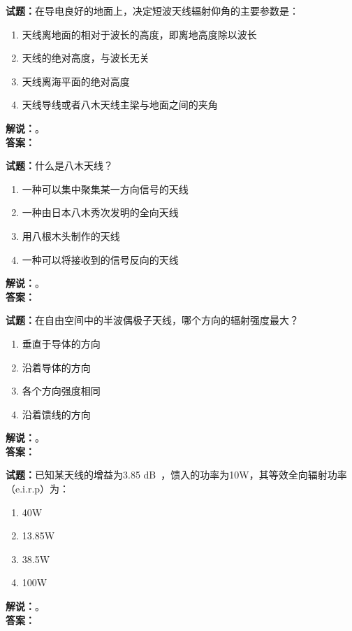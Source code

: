 \documentclass{ctexbook}
\begin{document}
\noindent\textbf{试题：}在导电良好的地面上，决定短波天线辐射仰角的主要参数是：
\begin{enumerate}[leftmargin=3em]
\item 天线离地面的相对于波长的高度，即离地高度除以波长
\item 天线的绝对高度，与波长无关
\item 天线离海平面的绝对高度
\item 天线导线或者八木天线主梁与地面之间的夹角
\end{enumerate}
\noindent\textbf{解说：}\textbf{}。\\\noindent\textbf{答案：}

\bigskip




\noindent\textbf{试题：}什么是八木天线？
\begin{enumerate}[leftmargin=3em]
\item 一种可以集中聚集某一方向信号的天线
\item 一种由日本八木秀次发明的全向天线
\item 用八根木头制作的天线
\item 一种可以将接收到的信号反向的天线
\end{enumerate}
\noindent\textbf{解说：}\textbf{}。\\\noindent\textbf{答案：}

\bigskip




\noindent\textbf{试题：}在自由空间中的半波偶极子天线，哪个方向的辐射强度最大？
\begin{enumerate}[leftmargin=3em]
\item 垂直于导体的方向
\item 沿着导体的方向
\item 各个方向强度相同
\item 沿着馈线的方向
\end{enumerate}
\noindent\textbf{解说：}\textbf{}。\\\noindent\textbf{答案：}

\bigskip




\noindent\textbf{试题：}已知某天线的增益为3.85 \unit[qualifier-mode=combine]{\deci\bel{}}，馈入的功率为10W，其等效全向辐射功率（e.i.r.p）为：
\begin{enumerate}[leftmargin=3em]
\item 40W
\item 13.85W
\item 38.5W
\item 100W
\end{enumerate}
\noindent\textbf{解说：}\textbf{}。\\\noindent\textbf{答案：}
\end{document}
